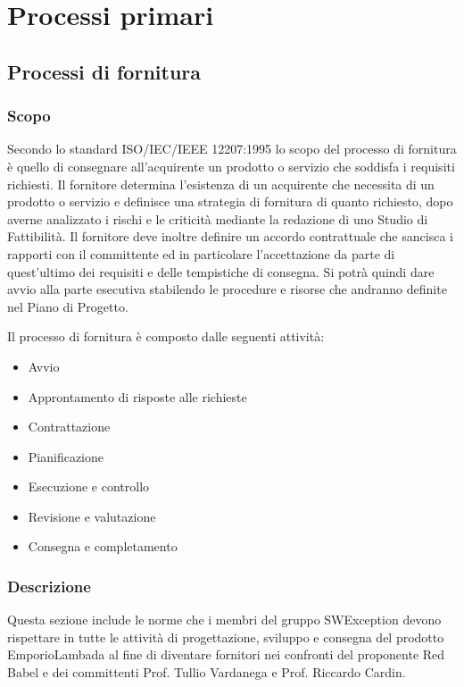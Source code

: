 \section{Processi primari}


\subsection{Processi di fornitura}
\subsubsection{Scopo} 
Secondo lo standard ISO/IEC/IEEE 12207:1995 lo scopo del processo di fornitura è quello di consegnare all'acquirente un prodotto o servizio che soddisfa i requisiti richiesti.  Il fornitore determina l'esistenza di un acquirente che necessita di un prodotto o servizio e definisce una strategia di fornitura di quanto richiesto, dopo averne analizzato i rischi e le criticità mediante la redazione di uno Studio di Fattibilità.
Il fornitore deve inoltre definire un accordo contrattuale che sancisca i rapporti con il committente ed in particolare l'accettazione da parte di quest'ultimo dei requisiti e delle tempistiche di consegna.  Si potrà quindi dare avvio alla parte esecutiva stabilendo le procedure e risorse che andranno definite nel Piano di Progetto.

Il processo di fornitura è composto dalle seguenti attività:
\begin{itemize}
\item Avvio
\item Approntamento di risposte alle richieste
\item Contrattazione
\item Pianificazione
\item Esecuzione e controllo
\item Revisione e valutazione
\item Consegna e completamento
\end{itemize}

\subsubsection{Descrizione}
Questa sezione include le norme che i membri del gruppo SWException devono rispettare in tutte le attività di progettazione, sviluppo e consegna del prodotto EmporioLambada al fine di diventare fornitori nei confronti del proponente Red Babel e dei committenti Prof. Tullio Vardanega e Prof. Riccardo Cardin.
